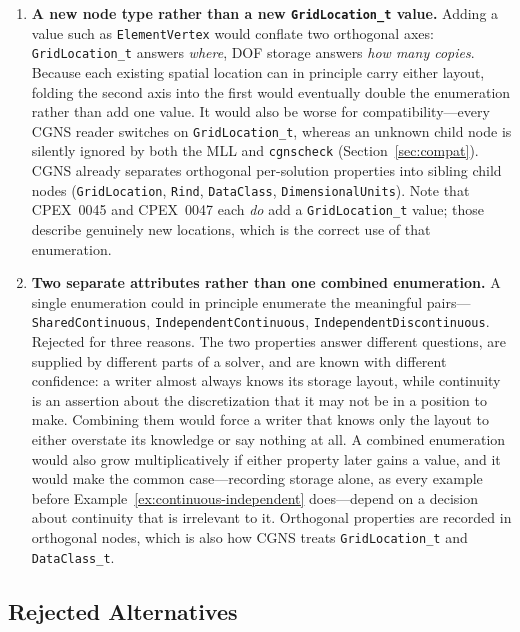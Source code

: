 \documentclass[11pt,letterpaper]{article}
\begin{document}
\begin{enumerate}[leftmargin=2em]
\item \label{dd:why-new-node} \textbf{A new node type rather than a new
  \texttt{GridLocation\_t} value.}  Adding a value such as
  \texttt{ElementVertex} would conflate two orthogonal axes:
  \texttt{GridLocation\_t} answers \emph{where}, DOF storage answers
  \emph{how many copies}.  Because each existing spatial location can in
  principle carry either layout, folding the second axis into the first
  would eventually double the enumeration rather than add one value.  It
  would also be worse for compatibility---every CGNS reader switches on
  \texttt{GridLocation\_t}, whereas an unknown child node is silently
  ignored by both the MLL and \texttt{cgnscheck}
  (Section~\ref{sec:compat}).  CGNS already separates orthogonal
  per-solution properties into sibling child nodes
  (\texttt{GridLocation}, \texttt{Rind}, \texttt{DataClass},
  \texttt{DimensionalUnits}).  Note that CPEX~0045 and CPEX~0047 each
  \emph{do} add a \texttt{GridLocation\_t} value; those describe
  genuinely new locations, which is the correct use of that enumeration.

\item \textbf{Two separate attributes rather than one combined
  enumeration.}  A single enumeration could in principle enumerate the
  meaningful pairs---\texttt{SharedContinuous},
  \texttt{IndependentContinuous}, \texttt{IndependentDiscontinuous}.
  Rejected for three reasons.  The two properties answer different
  questions, are supplied by different parts of a solver, and are known
  with different confidence: a writer almost always knows its storage
  layout, while continuity is an assertion about the discretization that
  it may not be in a position to make.  Combining them would force a
  writer that knows only the layout to either overstate its knowledge or
  say nothing at all.  A combined enumeration would also grow
  multiplicatively if either property later gains a value, and it would
  make the common case---recording storage alone, as every example
  before Example~\ref{ex:continuous-independent} does---depend on a
  decision about continuity that is irrelevant to it.  Orthogonal
  properties are recorded in orthogonal nodes, which is also how CGNS
  treats \texttt{GridLocation\_t} and \texttt{DataClass\_t}.

\end{enumerate}

\subsection{Rejected Alternatives}
\end{document}
